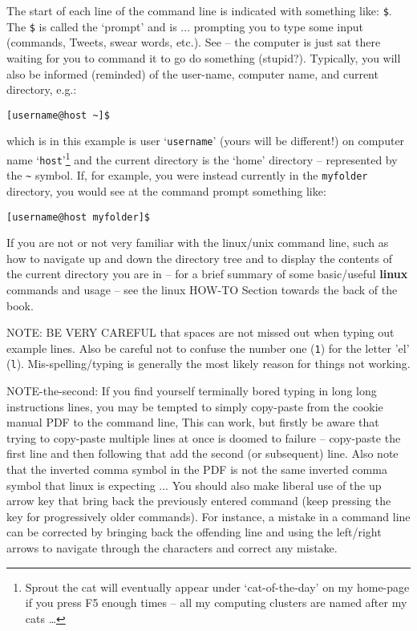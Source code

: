 The start of each line of the command line is indicated with something like: \texttt{\$}. The \texttt{\$} is called the ‘prompt’ and is ... prompting you to type some input (commands, Tweets, swear words, etc.). See – the computer is just sat there waiting for you to command it to go do something (stupid?). Typically, you will also be informed (reminded) of the user-name, computer name, and current directory, e.g.:

\vspace{-2mm}\begin{verbatim}
[username@host ~]$
\end{verbatim}\vspace{-2mm}

\noindent which is in this example is user ‘\texttt{username}’ (yours will be different!) on computer name ‘\texttt{host}’\footnote{Sprout the cat will eventually appear under ‘cat-of-the-day’ on my home-page if you press \textsf{F5} enough times – all my computing clusters are named after my cats …} and the current directory is the ‘home’ directory -- represented by the \texttt{\~} symbol. If, for example, you were instead currently in the \texttt{myfolder} directory, you would see at the command prompt something like:

\vspace{-2mm}\begin{verbatim}
[username@host myfolder]$
\end{verbatim}\vspace{-2mm}

If you are not or not very familiar with the linux/unix command line, such as how to navigate up and down the directory tree and to display the contents of the current directory you are in – for a brief summary of some basic/useful \textbf{linux} commands and usage -- see the linux HOW-TO Section towards the back of the book.

NOTE: BE VERY CAREFUL that spaces are not missed out when typing out example lines. Also be careful not to confuse the number one (\texttt{1}) for the letter 'el' (\texttt{l}). Mis-spelling/typing is generally the most likely reason for things not working.

NOTE-the-second: If you find yourself terminally bored typing in long long instructions lines, you may be tempted to simply copy-paste from the cookie manual PDF to the command line, This can work, but firstly be aware that trying to copy-paste multiple lines at once is doomed to failure -- copy-paste the first line and then following that add the second (or subsequent) line.
Also note that the inverted comma symbol in the PDF is not the same inverted comma symbol that linux is expecting ... You should also make liberal use of the up arrow key that bring back the previously entered command (keep pressing the key for progressively older commands). For instance, a mistake in a command line can be corrected by bringing back the offending line and using the left/right arrows to navigate through the characters and correct any mistake.

